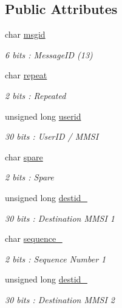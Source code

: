 \subsection*{Public Attributes}
\begin{DoxyCompactItemize}
\item 
char \mbox{\hyperlink{structaismsg__13_af5fe05db64597fe3218390e06406e848}{msgid}}
\begin{DoxyCompactList}\small\item\em 6 bits \+: Message\+ID (13) \end{DoxyCompactList}\item 
char \mbox{\hyperlink{structaismsg__13_ad02fcc6d5a26721ca30cb26ac3fa9a5c}{repeat}}
\begin{DoxyCompactList}\small\item\em 2 bits \+: Repeated \end{DoxyCompactList}\item 
unsigned long \mbox{\hyperlink{structaismsg__13_add4a6b65ea2131347397e18a8bff4aba}{userid}}
\begin{DoxyCompactList}\small\item\em 30 bits \+: User\+ID / M\+M\+SI \end{DoxyCompactList}\item 
char \mbox{\hyperlink{structaismsg__13_ab54125997275e0a21df81261387154f9}{spare}}
\begin{DoxyCompactList}\small\item\em 2 bits \+: Spare \end{DoxyCompactList}\item 
unsigned long \mbox{\hyperlink{structaismsg__13_a06cb425d1249a04dc565fb5e3b61be33}{destid\+\_}}
\begin{DoxyCompactList}\small\item\em 30 bits \+: Destination M\+M\+SI 1 \end{DoxyCompactList}\item 
char \mbox{\hyperlink{structaismsg__13_a8b2a707b6ad5e11bec1f62f381efaa28}{sequence\+\_}}
\begin{DoxyCompactList}\small\item\em 2 bits \+: Sequence Number 1 \end{DoxyCompactList}\item 
unsigned long \mbox{\hyperlink{structaismsg__13_a1e669036fb17300c898ae68bb396dc2c}{destid\+\_}}
\begin{DoxyCompactList}\small\item\em 30 bits \+: Destination M\+M\+SI 2 \end{DoxyCompactList}\item 

\end{DoxyCompactItemize}
